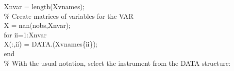 \hspace{1mm}\hspace{5mm} \hspace{5mm} \hspace{5mm} \hspace{5mm} Xnvar        = length(Xvnames); \\ 
\hspace{1mm}\hspace{5mm} \hspace{5mm} \hspace{5mm} \hspace{5mm} \textcolor{matlabgreen}{\% Create matrices of variables \textcolor{matlabblue}{for} the VAR }\\ 
\hspace{1mm}\hspace{5mm} \hspace{5mm} \hspace{5mm} \hspace{5mm} \hspace{5mm} X = nan(nobs,Xnvar); \\ 
\hspace{1mm}\hspace{5mm} \hspace{5mm} \hspace{5mm} \hspace{5mm} \hspace{5mm} \textcolor{matlabblue}{for} ii=1:Xnvar \\ 
\hspace{1mm}\hspace{5mm} \hspace{5mm} \hspace{5mm} \hspace{5mm} \hspace{5mm} \hspace{5mm} X(:,ii) = DATA.(Xvnames\{ii\}); \\ 
\hspace{1mm}\hspace{5mm} \hspace{5mm} \hspace{5mm} \hspace{5mm} \hspace{5mm} \textcolor{matlabblue}{end} \\ 
\hspace{1mm}\hspace{5mm} \hspace{5mm} \hspace{5mm} \hspace{5mm} \hspace{5mm} \textcolor{matlabgreen}{\% With the usual notation, select the instrument from the DATA structure: }\\ 
